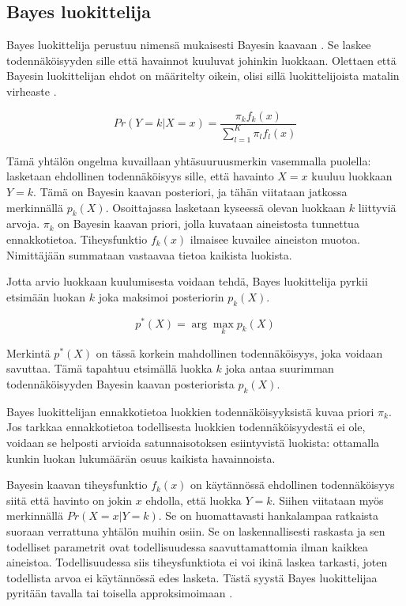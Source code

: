 \documentclass[finnish,twoside,openright]{HYgraduMLDS}
\begin{document}
\subsection{Bayes luokittelija}

Bayes luokittelija perustuu nimensä mukaisesti Bayesin kaavaan \cite{james2013ISLR}. Se laskee todennäköisyyden sille että havainnot kuuluvat johinkin luokkaan. Olettaen että Bayesin luokittelijan ehdot on määritelty oikein, olisi sillä luokittelijoista matalin virheaste \cite{james2013ISLR}.

\begin{equation} \label{eq:bayes}
    Pr(Y = k | X = x) = \frac{\pi_k f_k(x)}{\sum^K_{l=1} \pi_l f_l(x)}
\end{equation}

Tämä yhtälön ongelma kuvaillaan yhtäsuuruusmerkin vasemmalla puolella: lasketaan ehdollinen todennäköisyys sille, että havainto $X = x$ kuuluu luokkaan $Y = k$. Tämä on Bayesin kaavan posteriori, ja tähän viitataan jatkossa merkinnällä $p_k(X)$. Osoittajassa lasketaan kyseessä olevan luokkaan $k$ liittyviä arvoja. $\pi_k$ on Bayesin kaavan priori, jolla kuvataan aineistosta tunnettua ennakkotietoa. Tiheysfunktio $f_k(x)$ ilmaisee kuvailee aineiston muotoa. Nimittäjään summataan vastaavaa tietoa kaikista luokista.

Jotta arvio luokkaan kuulumisesta voidaan tehdä, Bayes luokittelija pyrkii etsimään luokan $k$ joka maksimoi posteriorin $p_k(X)$. 

\begin{equation}
    p^*(X) = \arg \max_k p_k(X)
\end{equation}

Merkintä $p^*(X)$ on tässä korkein mahdollinen todennäköisyys, joka voidaan savuttaa. Tämä tapahtuu etsimällä luokka $k$ joka antaa suurimman todennäköisyyden Bayesin kaavan posteriorista $p_k(X)$.

Bayes luokittelijan ennakkotietoa luokkien todennäköisyyksistä kuvaa priori $\pi_k$. Jos tarkkaa ennakkotietoa todellisesta luokkien todennäköisyydestä ei ole, voidaan se helposti arvioida satunnaisotoksen esiintyvistä luokista: ottamalla kunkin luokan lukumäärän osuus kaikista havainnoista. 

Bayesin kaavan tiheysfunktio $f_k(x)$ on käytännössä ehdollinen todennäköisyys siitä että havinto on jokin $x$ ehdolla, että luokka $Y = k$. Siihen viitataan myös merkinnällä $Pr(X = x | Y = k)$. Se on huomattavasti hankalampaa ratkaista suoraan verrattuna yhtälön muihin osiin. Se on laskennallisesti raskasta ja sen todelliset parametrit ovat todellisuudessa saavuttamattomia ilman kaikkea aineistoa. Todellisuudessa siis tiheysfunktiota ei voi ikinä laskea tarkasti, joten todellista arvoa ei käytännössä edes lasketa. Tästä syystä Bayes luokittelijaa pyritään tavalla tai toisella approksimoimaan \cite{james2013ISLR}.
\end{document}
